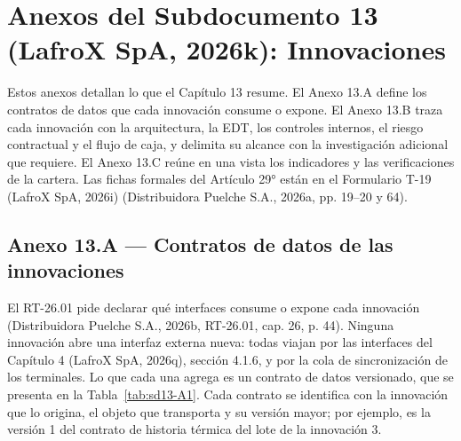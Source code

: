 
\chapter*{Anexos del Subdocumento 13 (LafroX SpA, 2026k): Innovaciones}
\label{cap:sd13-13_anexos}

Estos anexos detallan lo que el Capítulo 13 resume. El Anexo 13.A define los contratos de datos que cada innovación consume o expone. El Anexo 13.B traza cada innovación con la arquitectura, la EDT, los controles internos, el riesgo contractual y el flujo de caja, y delimita su alcance con la investigación adicional que requiere. El Anexo 13.C reúne en una vista los indicadores y las verificaciones de la cartera. Las fichas formales del Artículo 29° están en el Formulario T-19 (LafroX SpA, 2026i) (Distribuidora Puelche S.A., 2026a, pp. 19–20 y 64).

\section*{Anexo 13.A — Contratos de datos de las innovaciones}
\setcounter{table}{0}

El RT-26.01 pide declarar qué interfaces consume o expone cada innovación (Distribuidora Puelche S.A., 2026b, RT-26.01, cap. 26, p. 44). Ninguna innovación abre una interfaz externa nueva: todas viajan por las interfaces del Capítulo 4 (LafroX SpA, 2026q), sección 4.1.6, y por la cola de sincronización de los terminales. Lo que cada una agrega es un contrato de datos versionado, que se presenta en la Tabla~\ref{tab:sd13-A1}. Cada contrato se identifica con la innovación que lo origina, el objeto que transporta y su versión mayor; por ejemplo,  es la versión 1 del contrato de historia térmica del lote de la innovación 3.

